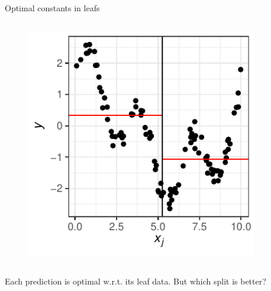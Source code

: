 \documentclass[11pt,compress,t,notes=noshow, xcolor=table]{beamer}
\begin{document}
\begin{vbframe}{Optimal constants in leafs}
\begin{columns}
\begin{column}{0.5\textwidth}
\begin{figure}
\includegraphics[width=0.9\textwidth]{figure/splitcrit_optimal-constant-sub2.pdf} 
\end{figure}

\end{column}
\end{columns}

Each prediction is optimal w.r.t. its leaf data. But which split is better?

\end{vbframe}
\end{document}
